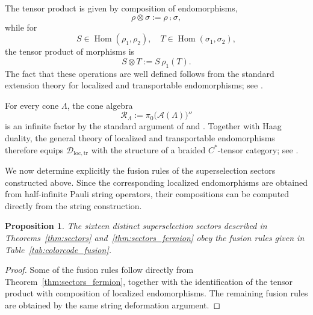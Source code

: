 \documentclass[a4paper,11pt]{article}
\newtheorem{proposition}[theorem]{Proposition}
\theoremstyle{definition}
\theoremstyle{remark}
\theoremstyle{remark}
\begin{document}
The tensor product is given by composition of endomorphisms,
\[
    \rho\otimes\sigma:=\rho\comp\sigma,
\]
while for
\[
    S\in\operatorname{Hom}(\rho_1,\rho_2), \quad T\in\operatorname{Hom}(\sigma_1,\sigma_2),
\]
the tensor product of morphisms is
\begin{equation}\label{eq:tensor_intertwiner}
    S\otimes T
    :=
    S\,\rho_1(T).
\end{equation}
The fact that these operations are well defined follows from the standard extension theory for localized and transportable endomorphisms; see \cite{Buchholz1982locality,Ogata2022braided}.

For every cone $\Lambda$, the cone algebra
\[
    \mathcal R_\Lambda
    :=
    \pi_0\bigl(\mathcal A(\Lambda)\bigr)''
\]
is an infinite factor by the standard argument of \cite[Theorem~5.1]{naaijkens2011localized} and \cite[Proposition~5.3]{keyl2006entanglement}. Together with Haag duality, the general theory of localized and transportable endomorphisms therefore equips $\mathcal D_{\mathrm{loc,tr}}$ with the structure of a braided $C^*$-tensor category; see \cite{Ogata2022braided}.

We now determine explicitly the fusion rules of the superselection sectors constructed above. Since the corresponding localized endomorphisms are obtained from half-infinite Pauli string operators, their compositions can be computed directly from the string construction.


\begin{proposition}\label{prop:fusion_rules}
    The sixteen distinct superselection sectors described in Theorems~\ref{thm:sectors} and~\ref{thm:sectors_fermion} obey the fusion rules given in Table~\ref{tab:colorcode_fusion}.
\end{proposition}

\begin{proof}
    Some of the fusion rules follow directly from Theorem~\ref{thm:sectors_fermion}, together with the identification of the tensor product with composition of localized endomorphisms. The remaining fusion rules are obtained by the same string deformation argument.
\end{proof}
\end{document}
